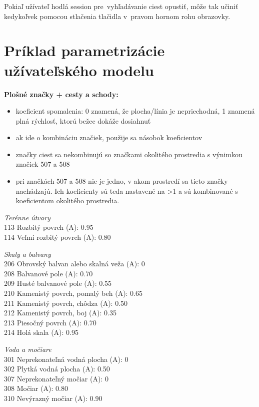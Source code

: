 \documentclass[12pt,a4paper]{report}
\begin{document}
Pokiaľ užívateľ hodlá session pre~vyhľadávanie ciest opustiť, môže tak učiniť kedykoľvek pomocou stlačenia tlačidla v~pravom hornom rohu obrazovky. 

\section{Príklad parametrizácie užívateľského modelu}\label{uzivatelsky_model}

\textbf{Plošné značky + cesty a schody:}

\begin{itemize}
    \item koeficient spomalenia: 0 znamená, že plocha/línia je nepriechodná, 1 znamená plná rýchlosť, ktorú bežec dokáže dosiahnuť
    \item ak ide o kombináciu značiek, použije sa násobok koeficientov
    \item značky ciest sa nekombinujú so značkami okolitého prostredia s výnimkou značiek 507 a 508
    \item pri značkách 507 a 508 nie je jedno, v akom prostredí sa tieto značky nachádzajú. Ich koeficienty sú teda nastavené na >1 a sú kombinované s koeficientom okolitého prostredia.
\end{itemize}

\textit{Terénne útvary}\\
113 Rozbitý povrch (A): 0.95\\
114 Veľmi rozbitý povrch (A): 0.80

\textit{Skaly a balvany}\\
206 Obrovský balvan alebo skalná veža (A): 0\\
208 Balvanové pole (A): 0.70\\
209 Husté balvanové pole (A): 0.55\\
210 Kamenistý povrch, pomalý beh (A): 0.65\\
211 Kamenistý povrch, chôdza (A): 0.50\\
212 Kamenistý povrch, boj (A): 0.35\\
213 Piesočný povrch (A): 0.70\\
214 Holá skala (A): 0.95

\textit{Voda a močiare}\\
301 Neprekonateľná vodná plocha (A): 0\\
302 Plytká vodná plocha (A): 0.50\\
307 Neprekonateľný močiar (A): 0\\
308 Močiar (A): 0.80\\
310 Nevýrazný močiar (A): 0.90
\end{document}
